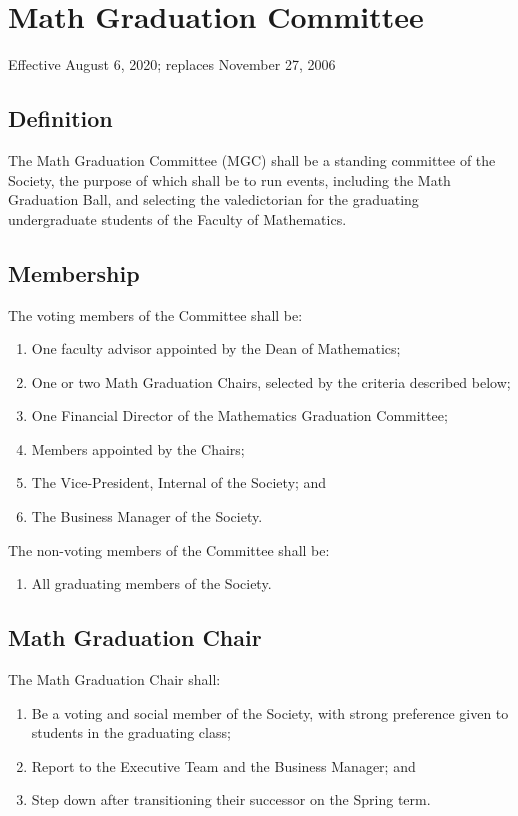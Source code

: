 \section{Math Graduation Committee}
Effective August 6, 2020; replaces November 27, 2006

\subsection{Definition}
The Math Graduation Committee (MGC) shall be a standing committee of the Society, the 
purpose of which shall be to run events, including the Math Graduation Ball, and 
selecting the valedictorian for the graduating undergraduate students of the Faculty 
of Mathematics.

\subsection{Membership}
The voting members of the Committee shall be:
\begin{enumerate}
\item One faculty advisor appointed by the Dean of Mathematics;
\item One or two Math Graduation Chairs, selected by the criteria described below;
\item One Financial Director of the Mathematics Graduation Committee;
\item Members appointed by the Chairs;
\item The Vice-President, Internal of the Society; and 
\item The Business Manager of the Society.
\end{enumerate}
The non-voting members of the Committee shall be:
\begin{enumerate}
\item All graduating members of the Society.
\end{enumerate}

\subsection{Math Graduation Chair}
The Math Graduation Chair shall:
\begin{enumerate}
\item Be a voting and social member of the Society, with strong preference given to students in the graduating class;
\item Report to the Executive Team and the Business Manager; and 
\item Step down after transitioning their successor on the Spring term.
\end{enumerate}

